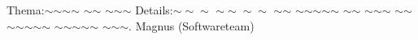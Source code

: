 
%
	{Thema:}{$\sim$$\sim$$\sim$$\sim$ $\sim$$\sim$ $\sim$$\sim$$\sim$}%
	{Details:}{$\sim\sim\sim$ $\sim\sim\sim\sim$ $\sim$$\sim$ $\sim$$\sim$$\sim$$\sim$$\sim$ $\sim$$\sim$ $\sim$$\sim$$\sim$ $\sim$$\sim$$\sim$$\sim$$\sim$$\sim$$\sim$ $\sim$$\sim$$\sim$$\sim$$\sim$ $\sim$$\sim$$\sim$.}
	{Magnus (Softwareteam)}
